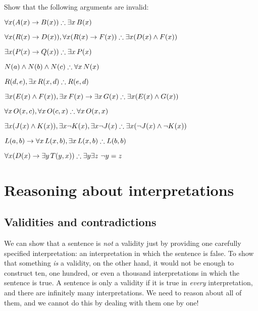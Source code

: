 \problempart
Show that the following arguments are invalid:
\begin{compactlist}
\item $\forall x(\atom{A}{x} \eif \atom{B}{x}) \therefore \exists x\, \atom{B}{x}$
\item $\forall x(\atom{R}{x} \eif \atom{D}{x}), \forall x(\atom{R}{x} \eif \atom{F}{x}) \therefore \exists x(\atom{D}{x} \eand \atom{F}{x})$
\item $\exists x(\atom{P}{x}\eif \atom{Q}{x}) \therefore \exists x\, \atom{P}{x}$
\item $\atom{N}{a} \eand \atom{N}{b} \eand \atom{N}{c} \therefore \forall x\, \atom{N}{x}$
\item $\atom{R}{d,e}, \exists x\, \atom{R}{x,d} \therefore \atom{R}{e,d}$
\item $\exists x(\atom{E}{x} \eand \atom{F}{x}), \exists x\, \atom{F}{x} \eif \exists x\, \atom{G}{x} \therefore \exists x(\atom{E}{x} \eand \atom{G}{x})$
\item $\forall x\, \atom{O}{x,c}, \forall x\, \atom{O}{c,x} \therefore \forall x\, \atom{O}{x,x}$
\item $\exists x(\atom{J}{x} \eand \atom{K}{x}), \exists x \enot \atom{K}{x}, \exists x \enot \atom{J}{x} \therefore \exists x(\enot \atom{J}{x} \eand \enot \atom{K}{x})$
\item $\atom{L}{a,b} \eif \forall x\, \atom{L}{x,b}, \exists x\, \atom{L}{x,b} \therefore \atom{L}{b,b}$
\item $\forall x(\atom{D}{x} \eif \exists y\, \atom{T}{y,x}) \therefore \exists y \exists z\ \enot y= z$
\end{compactlist}

\chapter{Reasoning about interpretations}

\section{Validities and contradictions}
We can show that a sentence is \emph{not} a validity just by providing one carefully specified interpretation: an interpretation in which the sentence is false. To show that something \emph{is} a validity, on the other hand, it would not be enough to construct ten, one hundred, or even a thousand interpretations in which the sentence is true. A sentence is only a validity if it is true in \emph{every} interpretation, and there are infinitely many interpretations. We need to reason about all of them, and we cannot do this by dealing with them one by one!


